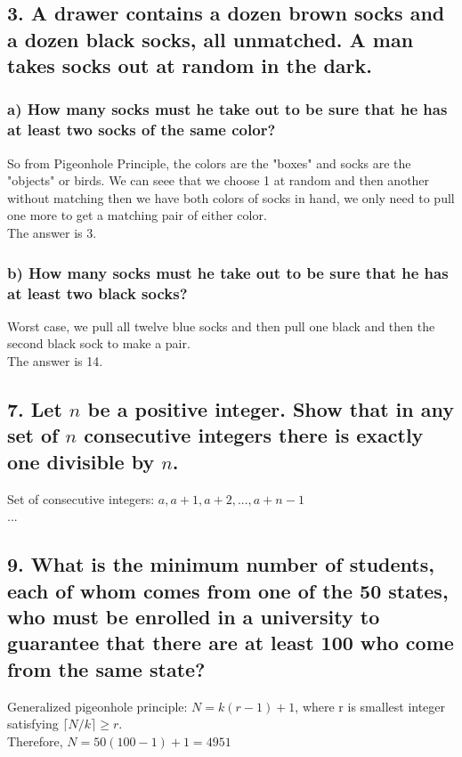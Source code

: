 \documentclass[11pt, oneside]{article} %
\numberwithin{equation}{section} %
\numberwithin{figure}{section} %
\numberwithin{table}{section} %
\begin{document}
\subsection{3. A drawer contains a dozen brown socks and a dozen black socks, all unmatched. A man takes socks out at random in the dark.}
\subsubsection{a) How many socks must he take out to be sure that he has at least two socks of the same color?}
So from Pigeonhole Principle, the colors are the "boxes" and socks are the "objects" or birds. We can seee that we choose 1 at random and then another without matching then we have both colors of socks in hand, we only need to pull one more to get a matching pair of either color. \\
The answer is 3. 

\subsubsection{b) How many socks must he take out to be sure that he has at least two black socks?}
Worst case, we pull all twelve blue socks and then pull one black and then the second black sock to make a  pair. \\
The answer is 14. 


\subsection{7. Let $n$ be a positive integer. Show that in any set of $n$ consecutive integers there is exactly one divisible by $n$.}
Set of consecutive integers: $a,a+1,a+2,$...$,a+n-1$ \\
...


\subsection{9. What is the minimum number of students, each of whom comes from one of the 50 states, who must be enrolled in a university to guarantee that there are at least 100 who come from the same state?}
Generalized pigeonhole principle: $N = k(r-1) +1$, where r is smallest integer satisfying $\lceil N/k\rceil \geq r$. \\
Therefore, $N=50(100-1) +1 = 4951$
\end{document}
